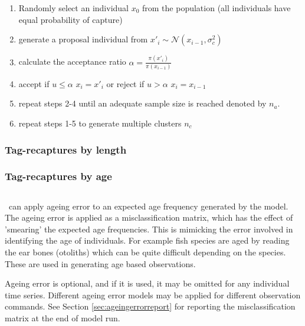 \begin{enumerate}\label{list:MH_algorithm}
	\item Randomly select an individual $x_0$ from the population (all individuals have equal probability of capture)
	
	\item generate a proposal individual from  $x'_i \sim \mathcal{N}(x_{i-1}, \sigma_c^2)$
	
	\item calculate the acceptance ratio $\alpha = \frac{\pi(x'_i)}{\pi(x_{i-1})}$
	
	\item accept if $u \leq \alpha$ $x_i = x'_i$ or reject if $u > \alpha$ $x_i = x_{i-1}$
	
	\item repeat steps 2-4 until an adequate sample size is reached denoted by \(n_a\).
	
	\item repeat steps 1-5 to generate multiple clusters \(n_c\)
\end{enumerate}


\subsubsection{Tag-recaptures by length}\label{subsubsec:tag_recap_by_length}


\subsubsection{Tag-recaptures by age}\label{subsubsec:tag_recap_by_age}


\subsection{}\label{subsec:ageing_error}
\IBM\ can apply ageing error to an expected age frequency generated by the model. The ageing error is applied as a misclassification matrix, which has the effect of 'smearing' the expected age frequencies. This is mimicking the error involved in identifying the age of individuals. For example fish species are aged by reading the ear bones (otoliths) which can be quite difficult depending on the species. These are used in generating age based observations. 

Ageing error is optional, and if it is used, it may be omitted for any individual time series. Different ageing error models may be applied for different observation commands. See Section \ref{sec:ageingerrorreport} for reporting the misclassification matrix at the end of model run.

